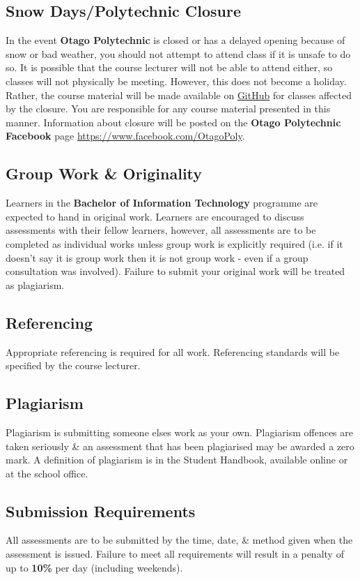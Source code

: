 \documentclass{article}
\begin{document}
\subsection*{Snow Days/Polytechnic Closure}
In the event \textbf{Otago Polytechnic} is closed or has a delayed opening because of snow or bad weather, you should not attempt to attend class if it is unsafe to do so. It is possible that the course lecturer will not be able to attend either, so classes will not physically be meeting. However, this does not become a holiday. Rather, the course material will be made available on \href{https://github.com/otago-polytechnic-bit-courses/ID607001-intro-app-dev-concepts}{GitHub} for classes affected by the closure. You are responsible for any course material presented in this manner. Information about closure will be posted on the \textbf{Otago Polytechnic Facebook} page \href{https://www.facebook.com/OtagoPoly}{https://www.facebook.com/OtagoPoly}.

\subsection*{Group Work \& Originality}
Learners in the \textbf{Bachelor of Information Technology} programme are expected to hand in original work. Learners are encouraged to discuss assessments with their fellow learners, however, all assessments are to be completed as individual works unless group work is explicitly required (i.e. if it doesn't say it is group work then it is not group work - even if a group consultation was involved). Failure to submit your original work will be treated as plagiarism.

\subsection*{Referencing}
Appropriate referencing is required for all work. Referencing standards will be specified by the course lecturer.

\subsection*{Plagiarism}
Plagiarism is submitting someone elses work as your own. Plagiarism offences are taken seriously \& an assessment that has been plagiarised may be awarded a zero mark. A definition of plagiarism is in the Student Handbook, available online or at the school office.

\subsection*{Submission Requirements}
All assessments are to be submitted by the time, date, \& method given when the assessment is issued. Failure to meet all requirements will result in a penalty of up to \textbf{10\%} per day (including weekends).
\end{document}
